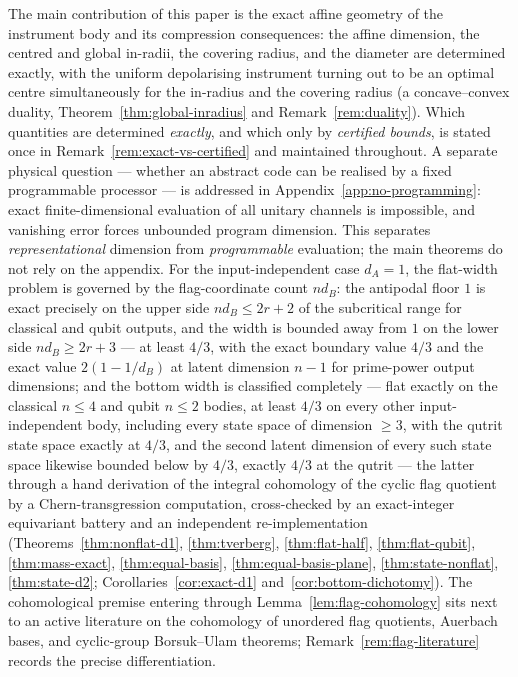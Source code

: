 \documentclass[11pt,a4paper]{article}
\begin{document}
The main contribution of this paper is the exact affine geometry of the instrument body and its compression consequences: the affine dimension, the centred and global in-radii, the covering radius, and the diameter are determined exactly, with the uniform depolarising instrument turning out to be an optimal centre simultaneously for the in-radius and the covering radius (a concave--convex duality, Theorem~\ref{thm:global-inradius} and Remark~\ref{rem:duality}). Which quantities are determined \emph{exactly}, and which only by \emph{certified bounds}, is stated once in Remark~\ref{rem:exact-vs-certified} and maintained throughout. A separate physical question --- whether an abstract code can be realised by a fixed programmable processor --- is addressed in Appendix~\ref{app:no-programming}: exact finite-dimensional evaluation of all unitary channels is impossible, and vanishing error forces unbounded program dimension. This separates \emph{representational} dimension from \emph{programmable} evaluation; the main theorems do not rely on the appendix. For the input-independent case $d_A=1$, the flat-width problem is governed by the flag-coordinate count $nd_B$: the antipodal floor $1$ is exact precisely on the upper side $nd_B\le2r+2$ of the subcritical range for classical and qubit outputs, and the width is bounded away from $1$ on the lower side $nd_B\ge2r+3$ --- at least $4/3$, with the exact boundary value $4/3$ and the exact value $2(1-1/d_B)$ at latent dimension $n-1$ for prime-power output dimensions; and the bottom width is classified completely --- flat exactly on the classical $n\le4$ and qubit $n\le2$ bodies, at least $4/3$ on every other input-independent body, including every state space of dimension $\ge3$, with the qutrit state space exactly at $4/3$, and the second latent dimension of every such state space likewise bounded below by $4/3$, exactly $4/3$ at the qutrit --- the latter through a hand derivation of the integral cohomology of the cyclic flag quotient by a Chern-transgression computation, cross-checked by an exact-integer equivariant battery and an independent re-implementation (Theorems~\ref{thm:nonflat-d1}, \ref{thm:tverberg}, \ref{thm:flat-half}, \ref{thm:flat-qubit}, \ref{thm:mass-exact}, \ref{thm:equal-basis}, \ref{thm:equal-basis-plane}, \ref{thm:state-nonflat}, \ref{thm:state-d2}; Corollaries~\ref{cor:exact-d1} and~\ref{cor:bottom-dichotomy}). The cohomological premise entering through Lemma~\ref{lem:flag-cohomology} sits next to an active literature on the cohomology of unordered flag quotients, Auerbach bases, and cyclic-group Borsuk--Ulam theorems; Remark~\ref{rem:flag-literature} records the precise differentiation.
\end{document}
